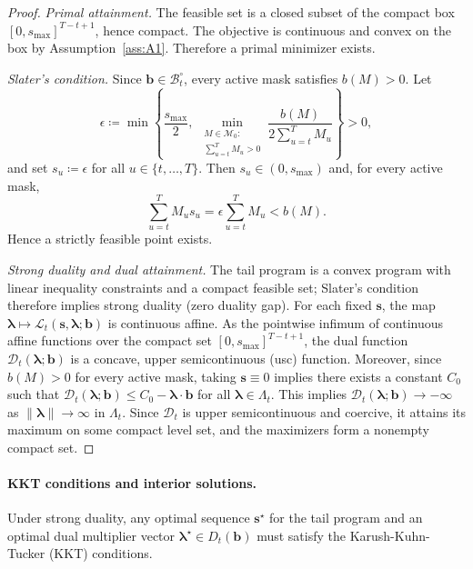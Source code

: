 \documentclass[11pt]{article}
\newcommand{\1}{\mathbf{1}}
\newcommand{\eqdef}{\coloneqq}
\newcommand{\mcal}{\mathcal{M}}
\newcommand{\bcal}{\mathcal{B}}
\begin{document}
\begin{proof}
  \emph{Primal attainment.}
  The feasible set is a closed subset of the compact box $[0,s_{\max}]^{T-t+1}$, hence compact.
  The objective is continuous and convex on the box by Assumption~\ref{ass:A1}.
  Therefore a primal minimizer exists.

  \emph{Slater's condition.}
  Since $\mathbf{b} \in \bcal_t^\circ$, every active mask satisfies $b(M)>0$.
  Let
  \begin{equation*}
    \epsilon
    \eqdef
    \min\left\{\frac{s_{\max}}{2},\
      \min_{\substack{M \in \mcal_{0}:\\[2pt] \sum_{u=t}^{T} M_u>0}}
    \frac{b(M)}{2\sum_{u=t}^{T} M_u}\right\}
    > 0,
  \end{equation*}
  and set $s_u \eqdef \epsilon$ for all $u \in \{t,\dots,T\}$.
  Then $s_u \in (0,s_{\max})$ and, for every active mask,
  \begin{equation*}
    \sum_{u=t}^{T} M_u s_u
    = \epsilon \sum_{u=t}^{T} M_u < b(M).
  \end{equation*}
  Hence a strictly feasible point exists.

  \emph{Strong duality and dual attainment.}
  The tail program is a convex program with linear inequality constraints and a compact feasible set; Slater's condition therefore implies strong duality (zero duality gap).
  For each fixed $\mathbf{s}$, the map $\boldsymbol{\lambda} \mapsto \mathcal{L}_t(\mathbf{s},\boldsymbol{\lambda};\mathbf{b})$ is continuous affine. As the pointwise infimum of continuous affine functions over the compact set $[0,s_{\max}]^{T-t+1}$, the dual function $\mathcal{D}_t(\boldsymbol{\lambda};\mathbf{b})$ is a concave, upper semicontinuous (usc) function.
  Moreover, since $b(M)>0$ for every active mask, taking $\mathbf{s} \equiv 0$ implies there exists a constant $C_0$ such that
  $\mathcal{D}_t(\boldsymbol{\lambda};\mathbf{b}) \leq C_0 - \boldsymbol{\lambda}\cdot\mathbf{b}$
  for all $\boldsymbol{\lambda} \in \Lambda_t$. This implies $\mathcal{D}_t(\boldsymbol{\lambda};\mathbf{b}) \to -\infty$ as $\|\boldsymbol{\lambda}\|\to\infty$ in $\Lambda_t$.
  Since $\mathcal{D}_t$ is upper semicontinuous and coercive, it attains its maximum on some compact level set, and the maximizers form a nonempty compact set. \qedhere
\end{proof}


\paragraph{KKT conditions and interior solutions.}
Under strong duality, any optimal sequence $\mathbf{s}^\star$ for the tail program and an optimal dual multiplier vector $\boldsymbol{\lambda}^\star \in D_t(\mathbf{b})$ must satisfy the Karush-Kuhn-Tucker (KKT) conditions.
\end{document}
